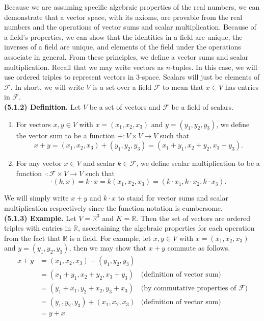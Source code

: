 \documentclass[12pt]{book}
\def\R{{\mathbb{R}}}
\def\cF{{\mathcal{F}}}
\begin{document}
Because we are assuming specific algebraic properties of the real numbers, we can demonstrate that a vector space, with its axioms, are provable from the real numbers and the operations of vector sums and scalar multiplication. Because of a field's properties, we can show that the identities in a field are unique, the inverses of a field are unique, and elements of the field under the operations associate in general. From these principles, we define a vector sums and scalar multiplication. Recall that we may write vectors as $n$-tuples. In this case, we will use ordered triples to represent vectors in 3-space. Scalars will just be elements of $\cF$. In short, we will write $V$ is a set over a field $\cF$ to mean that $x\in V$ has entries in $\cF$.\\

\noindent\textbf{(5.1.2) Definition.} Let $V$ be a set of vectors and $\cF$ be a field of scalars.
\begin{enumerate}
\item For vectors $x,y\in V$ with $x=(x_1,x_2,x_3)$ and $y=(y_1,y_2,y_3)$, we define the vector sum to be a function $+\colon V\times V\rightarrow V$ such that 
\[x+y=(x_1,x_2,x_3)+(y_1,y_2,y_3)=(x_1+y_1,x_2+y_2,x_3+y_3).\]
\item For any vector $x\in V$ and scalar $k\in\cF$, we define scalar multiplication to be a function $\cdot\colon\cF\times V\rightarrow V$ such that
\[\cdot(k,x)=k\cdot x=k(x_1,x_2,x_3)=(k\cdot x_1,k\cdot x_2,k\cdot x_3).\]
\end{enumerate}

We will simply write $x+y$ and $k\cdot x$ to stand for vector sums and scalar multiplication respectively since the function notation is cumbersome.\\

\noindent\textbf{(5.1.3) Example.} Let $V=\R^3$ and $K=\R$. Then the set of vectors are ordered triples with entries in $\R$, ascertaining the algebraic properties for each operation from the fact that $\R$ is a field. For example, let $x,y\in V$ with $x=(x_1,x_2,x_3)$ and $y=(y_1,y_2,y_3)$, then we may show that $x+y$ commute as follows.
\begin{align*}
x+y & = (x_1,x_2,x_3) + (y_1,y_2,y_3)\\
 & = (x_1+y_1,x_2+y_2,x_3+y_3) & \text{(definition of vector sum)}\\
 & = (y_1+x_1,y_2+x_2,y_3+x_3) & \text{(by commutative properties of $\cF$)}\\
 & = (y_1,y_2,y_3) + (x_1,x_2,x_3) & \text{(definition of vector sum)}\\
 & = y+x
\end{align*}
\end{document}

